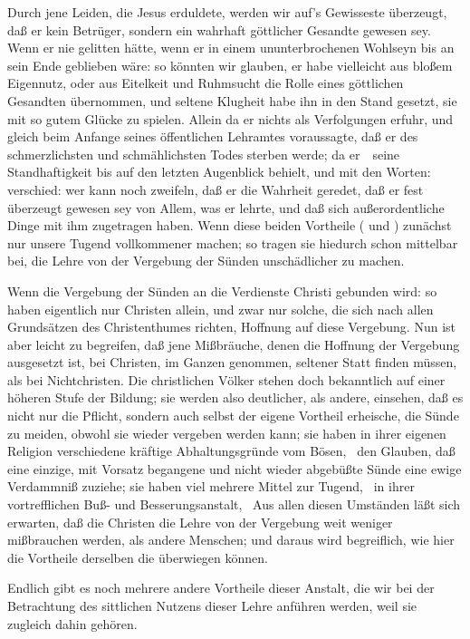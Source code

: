 \begin{aufza}
\begin{aufzb}
\begin{aufzc}
\item Durch jene Leiden, die Jesus erduldete, werden wir auf's Gewisseste überzeugt, daß er kein Betrüger, sondern ein wahrhaft göttlicher Gesandte gewesen sey. Wenn er nie gelitten hätte, wenn er in einem ununterbrochenen Wohlseyn bis an sein Ende geblieben wäre: so könnten wir glauben, er habe vielleicht aus bloßem Eigennutz, oder aus Eitelkeit und Ruhmsucht die Rolle eines göttlichen Gesandten übernommen, und seltene Klugheit habe ihn in den Stand gesetzt, sie mit so gutem Glücke zu spielen. Allein da er nichts als Verfolgungen erfuhr, und gleich beim Anfange seines öffentlichen Lehramtes voraussagte, daß er des schmerzlichsten und schmählichsten Todes sterben werde; da er~\ seine Standhaftigkeit bis auf den letzten Augenblick behielt, und mit den Worten:  verschied: wer kann noch zweifeln, daß er die Wahrheit geredet, daß er fest überzeugt gewesen sey von Allem, was er lehrte, und daß sich außerordentliche Dinge mit ihm zugetragen haben. Wenn diese beiden Vortheile ( und ) zunächst nur unsere Tugend vollkommener machen; so tragen sie hiedurch schon mittelbar bei, die Lehre von der Vergebung der Sünden unschädlicher zu machen.
\item Wenn die Vergebung der Sünden an die Verdienste Christi gebunden wird: so haben eigentlich nur Christen allein, und zwar nur solche, die sich nach allen Grundsätzen des Christenthumes richten, Hoffnung auf diese Vergebung. Nun ist aber leicht zu begreifen, daß jene Mißbräuche, denen die Hoffnung der Vergebung ausgesetzt ist, bei Christen, im Ganzen genommen, seltener Statt finden müssen, als bei Nichtchristen. Die christlichen Völker stehen doch bekanntlich auf einer höheren Stufe der Bildung; sie werden also deutlicher, als andere, einsehen, daß es nicht nur die Pflicht, sondern auch selbst der eigene Vortheil erheische, die Sünde zu meiden, obwohl sie wieder vergeben werden kann; sie haben in ihrer eigenen Religion verschiedene kräftige Abhaltungsgründe vom Bösen, \zB\ den Glauben, daß eine einzige, mit Vorsatz begangene und nicht wieder abgebüßte Sünde eine ewige Verdammniß zuziehe; sie haben viel mehrere Mittel zur Tugend, \zB\ in ihrer vortrefflichen Buß- und Besserungsanstalt, \usw\ Aus allen diesen Umständen läßt sich erwarten, daß die Christen die Lehre von der Vergebung weit weniger mißbrauchen werden, als andere Menschen; und daraus wird begreiflich, wie hier die Vortheile derselben die  überwiegen können.
\item Endlich gibt es noch mehrere andere Vortheile dieser Anstalt, die wir bei der Betrachtung des sittlichen Nutzens dieser Lehre anführen werden, weil sie zugleich dahin gehören.~

\end{aufzc}
\end{aufzb}
\end{aufza}
